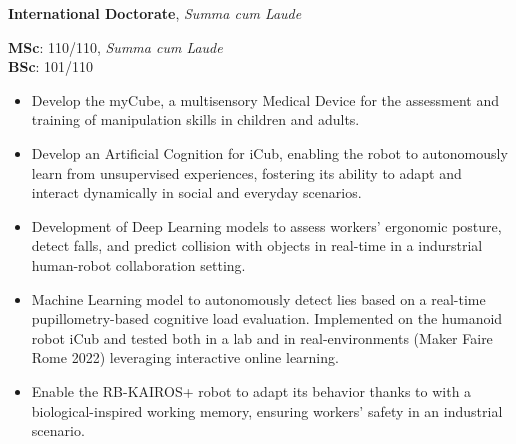 

  \textbf{International Doctorate}, \textit{Summa cum Laude}   
  
  
    \divider
    
  \textbf{MSc}: 110/110, \textit{Summa cum Laude}\\\textbf{BSc}: 101/110   
  
  

    \begin{itemize}
    \item Develop the myCube, a multisensory Medical Device for the assessment and training of manipulation skills in children and adults.
    \end{itemize}
    \smallskip
  
    \begin{itemize}
    \item Develop an Artificial Cognition for iCub, enabling the robot to autonomously learn from unsupervised experiences, fostering its ability to adapt and interact dynamically in social and everyday scenarios.
    \end{itemize}
    \smallskip
  
    \begin{itemize}
    \item Development of Deep Learning models to assess workers' ergonomic posture, detect falls, and predict collision with objects in real-time in a indurstrial human-robot collaboration setting.
    \end{itemize}
    \smallskip
  
    \begin{itemize}
    \item Machine Learning model to autonomously detect lies based on a real-time pupillometry-based cognitive load evaluation. Implemented on the humanoid robot iCub and tested both in a lab and in real-environments (Maker Faire Rome 2022) leveraging interactive online learning.
    \end{itemize}
    \smallskip
  
    \begin{itemize}
    \item Enable the RB-KAIROS+ robot to adapt its behavior thanks to with a biological-inspired working memory, ensuring workers' safety in an industrial scenario.
    \end{itemize}
    \smallskip
  
  